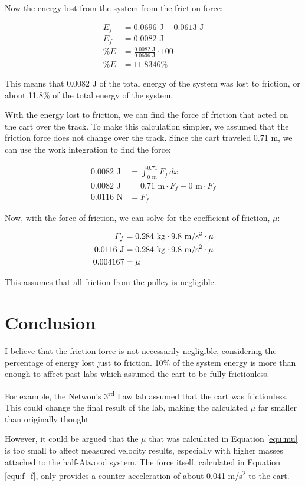 \documentclass[twocolumn]{article}
\begin{document}
Now the energy lost from the system from the friction force:

\begin{align}
    E_f &= 0.0696 \text{ J} - 0.0613 \text{ J} \\
    E_f &= 0.0082 \text{ J} \\
    \%E &= \frac{0.0082 \text{ J}}{0.0696 \text{ J}} \cdot 100
    \\
    \%E &= 11.8346\%
\end{align}

This means that 0.0082 J of the total energy of the system was lost to friction,
or about 11.8\% of the total energy of the system.

With the energy lost to friction, we can find the force of friction that acted
on the cart over the track. To make this calculation simpler, we assumed that
the friction force does not change over the track. Since the cart traveled 0.71
m, we can use the work integration to find the force:

\begin{align}
    0.0082 \text{ J} &= \int_{0 \text{ m}}^{0.71} F_f \,dx \\
    0.0082 \text{ J} &= 0.71 \text{ m} \cdot F_f - 0 \text{ m} \cdot F_f \\
    \label{equ:f_f} 0.0116 \text{ N} &= F_f
\end{align}

Now, with the force of friction, we can solve for the coefficient of friction,
$\mu$:

\begin{align}
    F_f &= 0.284 \text{ kg} \cdot 9.8 \text{ m/s\textsuperscript{2}} \cdot \mu
        \\
    0.0116 \text{ J} &= 0.284 \text{ kg} \cdot 9.8 \text{
        m/s\textsuperscript{2}} \cdot \mu \\
    \label{equ:mu} 0.004167 &= \mu
\end{align}

This assumes that all friction from the pulley is negligible.

\section{Conclusion}
I believe that the friction force is not necessarily negligible, considering the
percentage of energy lost just to friction. 10\% of the system energy is more
than enough to affect past labs which assumed the cart to be fully frictionless.

For example, the Netwon's 3\textsuperscript{rd} Law lab assumed that the cart
was frictionless. This could change the final result of the lab, making the
calculated $\mu$ far smaller than originally thought.

However, it could be argued that the $\mu$ that was calculated in Equation
\ref{equ:mu} is too small to affect measured velocity results, especially with
higher masses attached to the half-Atwood system. The force itself, calculated
in Equation \ref{equ:f_f}, only provides a counter-acceleration of about 0.041
m/s\textsuperscript{2} to the cart.
\end{document}
